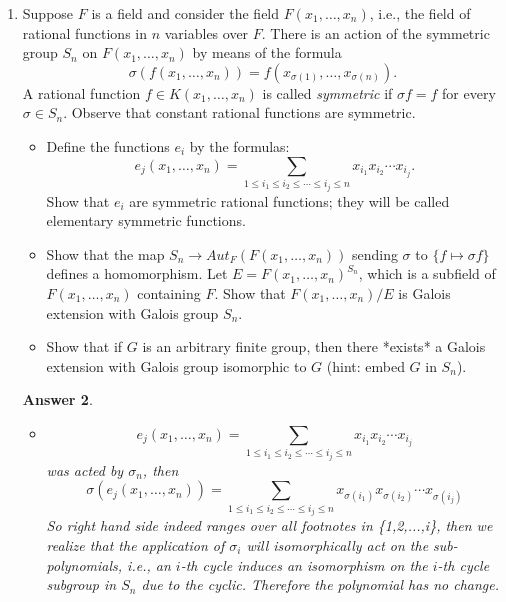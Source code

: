 \documentclass[11pt,leqno]{article}
\newcommand{\<}[1]{{\langle}#1 {\rangle}}
\theoremstyle{plain}
\newtheorem*{answer*}{Answer}
\theoremstyle{definition}
\theoremstyle{remark}
\numberwithin{equation}{section}
\begin{document}
\begin{enumerate}
\begin{answer*}
\begin{itemize}
        \end{itemize}
    \end{answer*}
    
    
    

\item Suppose $F$ is a field and consider the field $F(x_1,\ldots,x_n)$, i.e., the field of rational functions in $n$ variables over $F$.  There is an action of the symmetric group $S_n$ on $F(x_1,\ldots,x_n)$ by means of the formula
    \[
    \sigma(f(x_1,\ldots,x_n)) = f(x_{\sigma(1)},\ldots,x_{\sigma(n)}).
    \]
    A rational function $f \in K(x_1,\ldots,x_n)$ is called {\em symmetric} if $\sigma f = f$ for every $\sigma \in S_n$.  Observe that constant rational functions are symmetric.
    \begin{itemize}
    \item[i)] Define the functions $e_i$ by the formulas:
    \[
    e_j(x_1,\ldots,x_n) = \sum_{1 \leq i_1 \leq i_2 \leq \cdots \leq i_j \leq n} x_{i_1} x_{i_2} \cdots x_{i_j}.
    \]
    Show that $e_i$ are symmetric rational functions; they will be called elementary symmetric functions.
    \item[ii)] Show that the map $S_n \to Aut_F(F(x_1,\ldots,x_n))$ sending $\sigma$ to $\{ f \mapsto \sigma f \}$ defines a homomorphism.  Let $E = F(x_1,\ldots,x_n)^{S_n}$, which is a subfield of $F(x_1,\ldots,x_n)$ containing $F$.  Show that $F(x_1,\ldots,x_n)/E$ is Galois extension with Galois group $S_n$.
    \item[iii)] Show that if $G$ is an arbitrary finite group, then there *exists* a Galois extension with Galois group isomorphic to $G$ (hint: embed $G$ in $S_n$).
    \end{itemize}

    \begin{answer*}
        \begin{itemize}
            \item [i)] 
            $$ e_j(x_1,\ldots,x_n) = \sum_{1 \leq i_1 \leq i_2 \leq \cdots \leq i_j \leq n} x_{i_1} x_{i_2} \cdots x_{i_j} $$ was acted by $\sigma_n$, then $$ \sigma(e_j(x_1,\ldots,x_n)) = \sum_{1 \leq i_1 \leq i_2 \leq \cdots \leq i_j \leq n} x_{\sigma(i_1)} x_{\sigma(i_2)} \cdots x_{\sigma(i_j)} $$ So right hand side indeed ranges over all footnotes in \{1,2,...,i\}, then we realize that the application of $\sigma_i$ will isomorphically act on the sub-polynomials, i.e., an $i$-th cycle induces an isomorphism on the $i$-th cycle subgroup in $S_n$ due to the cyclic. Therefore the polynomial has no change.
            

\end{itemize}
\end{answer*}
\end{enumerate}
\end{document}
